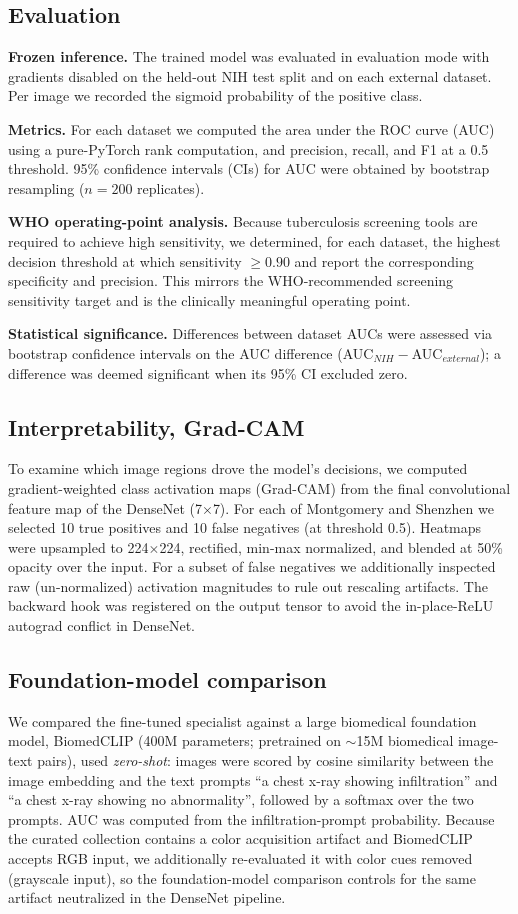 \documentclass[runningheads]{llncs}
\begin{document}
\subsection{Evaluation}
\textbf{Frozen inference.} The trained model was evaluated in evaluation mode with gradients disabled on the held-out NIH test split and on each external dataset. Per image we recorded the sigmoid probability of the positive class.

\textbf{Metrics.} For each dataset we computed the area under the ROC curve (AUC) using a pure-PyTorch rank computation, and precision, recall, and F1 at a 0.5 threshold. 95\% confidence intervals (CIs) for AUC were obtained by bootstrap resampling ($n=200$ replicates).

\textbf{WHO operating-point analysis.} Because tuberculosis screening tools are required to achieve high sensitivity, we determined, for each dataset, the highest decision threshold at which sensitivity $\geq 0.90$ and report the corresponding specificity and precision. This mirrors the WHO-recommended screening sensitivity target and is the clinically meaningful operating point.

\textbf{Statistical significance.} Differences between dataset AUCs were assessed via bootstrap confidence intervals on the AUC difference (AUC$_{NIH} - $AUC$_{external}$); a difference was deemed significant when its 95\% CI excluded zero.

\subsection{Interpretability, Grad-CAM}
To examine which image regions drove the model's decisions, we computed gradient-weighted class activation maps (Grad-CAM) \cite{selvaraju2017} from the final convolutional feature map of the DenseNet (7$\times$7). For each of Montgomery and Shenzhen we selected 10 true positives and 10 false negatives (at threshold 0.5). Heatmaps were upsampled to 224$\times$224, rectified, min-max normalized, and blended at 50\% opacity over the input. For a subset of false negatives we additionally inspected raw (un-normalized) activation magnitudes to rule out rescaling artifacts. The backward hook was registered on the output tensor to avoid the in-place-ReLU autograd conflict in DenseNet.

\subsection{Foundation-model comparison}
We compared the fine-tuned specialist against a large biomedical foundation model, BiomedCLIP (400M parameters; pretrained on $\sim$15M biomedical image-text pairs), used \emph{zero-shot}: images were scored by cosine similarity between the image embedding and the text prompts ``a chest x-ray showing infiltration'' and ``a chest x-ray showing no abnormality'', followed by a softmax over the two prompts. AUC was computed from the infiltration-prompt probability. Because the curated collection contains a color acquisition artifact and BiomedCLIP accepts RGB input, we additionally re-evaluated it with color cues removed (grayscale input), so the foundation-model comparison controls for the same artifact neutralized in the DenseNet pipeline.
\end{document}
